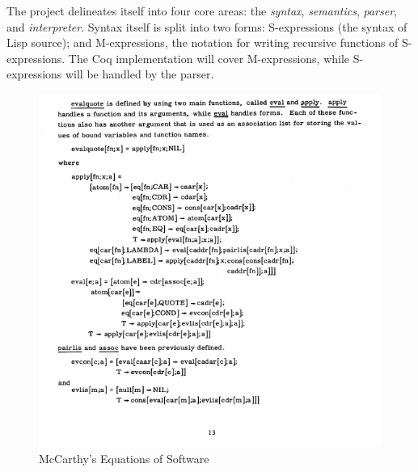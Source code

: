 \documentclass[10pt]{article}
\begin{document}
The project delineates itself into four core areas: the \emph{syntax},
\emph{semantics}, \emph{parser}, and \emph{interpreter}. Syntax itself
is split into two forms: S-expressions (the syntax of Lisp source);
and M-expressions, the notation for writing recursive functions of
S-expressions. The Coq implementation will cover M-expressions, while
S-expressions will be handled by the parser.

\begin{figure}[h]
\includegraphics{Lisp_Maxwells_Equations}
\caption{McCarthy's Equations of Software}
\end{figure}

\end{document}
